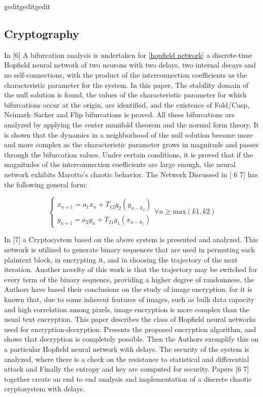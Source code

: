 geditgeditgedit\documentclass[12pt, letterpaper]{article}
\begin{document}
\subsection*{Cryptography}
In [6] A bifurcation analysis is undertaken for \ref{hopfield network} a discrete-time Hopfield neural network of two neurons with two delays, two internal decays and no self-connections, with the product of the interconnection coefficients as the characteristic parameter for the system. In this paper, The stability domain of the null solution is found, the values of the characteristic parameter for which bifurcations occur at the origin, are identified, and the existence of Fold/Cusp, Neimark–Sacker and Flip bifurcations is proved. All these bifurcations are analyzed by applying the center manifold theorem and the normal form theory. It is shown that the dynamics in a neighborhood of the null solution become more and more complex as the characteristic parameter grows in magnitude and passes through the bifurcation values. Under certain conditions, it is proved that if the magnitudes of the interconnection coefficients are large enough, the neural network exhibits Marotto’s chaotic behavior. The Network Discussed in [ 6 7] has the following general form:

\begin{equation}\label{hopfield network}
    \begin{cases}
    x_{n+1} = a_{1}x_{n} + T_{12}g_{2}(y_{n - k_{2}})\\
    y_{n+1} = a_{2}y_{n} + T_{21}g_{1}(x_{n - k_{1}})
    \end{cases} \forall n \geq \text{max}(k1, k2)
\end{equation}


In [7] a Cryptosystem based on the above system is presented and analyzed. This network is utilized to generate binary sequences that are used in permuting each plaintext block, in encrypting it, and in choosing the trajectory of the next iteration. Another novelty of this work is that the trajectory may be switched for every term of the binary sequence, providing a higher degree of randomness. the Authors have based their conclusions on the study of image encryption, for it is known that, due to some inherent features of images, such as bulk data capacity and high correlation among pixels, image encryption is more complex than
the usual text encryption. This paper describes the class of Hopfield neural networks
used for encryption-decryption. Presents the proposed encryption algorithm, and shows
that decryption is completely possible. Then the Authors exemplify this on a particular Hopfield neural network with delays. The security of the system is analyzed, where there is a check on the resistance to statistical and differential attack and Finally the entropy and key are computed for
security. Papers [6 7] together create an end to end analysis and implementation of a discrete chaotic cryptosystem with delays.
\end{document}
